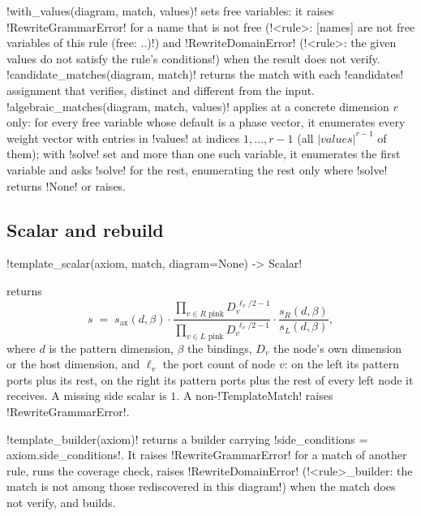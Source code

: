 \py!with_values(diagram, match, values)! sets free variables: it raises \py!RewriteGrammarError!
for a name that is not free (\code!<rule>: [names] are not free variables of this rule (free: ..)!)
and \py!RewriteDomainError! (\code!<rule>: the given values do not satisfy the rule's conditions!)
when the result does not verify. \py!candidate_matches(diagram, match)! returns the match with each
\py!candidates! assignment that verifies, distinct and different from the input.
\py!algebraic_matches(diagram, match, values)! applies at a concrete dimension $r$ only: for every
free variable whose default is a phase vector, it enumerates every weight vector with entries in
\py!values! at indices $1,\dots,r-1$ (all $|\mathit{values}|^{r-1}$ of them); with \py!solve! set
and more than one such variable, it enumerates the first variable and asks \py!solve! for the
rest, enumerating the rest only where \py!solve! returns \py!None! or raises.

\subsection{Scalar and rebuild}

\begin{signature}
\py!template_scalar(axiom, match, diagram=None) -> Scalar!
\end{signature}
returns
\begin{equation}\label{eq:rewriting-template-scalar}
  s \;=\; s_{\mathrm{ax}}(d,\beta)\cdot
  \frac{\prod_{v\in R\text{ pink}} D_v^{\,\ell_v/2-1}}{\prod_{v\in L\text{ pink}} D_v^{\,\ell_v/2-1}}
  \cdot \frac{s_R(d,\beta)}{s_L(d,\beta)} ,
\end{equation}
where $d$ is the pattern dimension, $\beta$ the bindings, $D_v$ the node's own dimension or the
host dimension, and $\ell_v$ the port count of node $v$: on the left its pattern ports plus its
rest, on the right its pattern ports plus the rest of every left node it receives. A missing side
scalar is $1$. A non-\py!TemplateMatch! raises \py!RewriteGrammarError!.

\py!template_builder(axiom)! returns a builder carrying \py!side_conditions = axiom.side_conditions!.
It raises \py!RewriteGrammarError! for a match of another rule, runs the coverage check, raises
\py!RewriteDomainError! (\code!<rule>_builder: the match is not among those rediscovered in this diagram!)
when the match does not verify, and builds.

